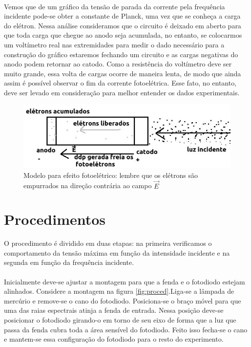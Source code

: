 \documentclass[a4paper,11pt]{article}
\begin{document}
\paragraph{}Vemos que de um gráfico da tensão de parada da
corrente pela frequência incidente pode-se obter a constante 
de Planck, uma vez que se conheça a carga do elétron. Nessa
análise consideramos que o circuito é deixado em aberto para
que toda carga que chegue ao anodo seja acumulada, no
entanto, se
colocarmos um voltímetro real nas extremidades para medir o
dado necessário para a construção do gráfico estaremos
fechando um circuito e as cargas negativas do anodo podem
retornar ao catodo. Como a resistência do voltímetro deve
ser muito grande, essa volta de cargas ocorre de maneira
lenta, de modo que ainda assim é possível observar o fim da
corrente fotoelétrica. Esse fato, no entanto, deve ser levado
em consideração para melhor entender os dados experimentais.
\FloatBarrier
\begin{figure}[!htp]
    \centering
    \includegraphics[scale = 0.5]{./images/foto-eletric.jpeg}
    \caption{Modelo para efeito fotoelétrico: lembre que os
    elétrons são empurrados na direção contrária ao campo
    $\vec{E}$}
    \label{fig:efeitoFE}
\end{figure}
\FloatBarrier
\newpage
\section{Procedimentos}
\paragraph{} O procedimento é dividido em duas etapas: na
primeira verificamos o comportamento da tensão máxima em
função da intensidade incidente e na segunda em função da
frequência incidente.

\paragraph{}Inicialmente deve-se ajustar a montagem para que
a fenda e o fotodiodo estejam alinhados. Considere a
montagem na figura \ref{fig:proced}.Liga-se a lâmpada de
mercúrio e remove-se o cano
do fotodiodo. Posiciona-se o braço móvel para que uma
das raias espectrais atinja a fenda de entrada. Nessa posição
deve-se posicionar o fotodiodo girando-o em torno de seu eixo de forma que
a luz que passa da fenda cubra toda a área sensível do
fotodiodo. Feito isso fecha-se o cano e mantem-se essa
configuração do fotodiodo para o resto do experimento.
\end{document}

